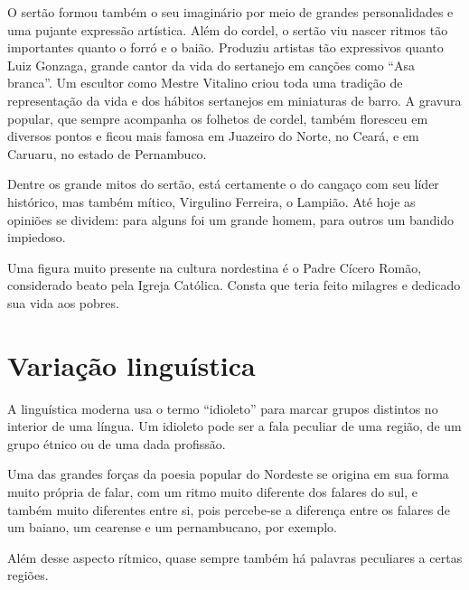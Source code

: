 O sertão formou também o seu imaginário por meio de grandes
personalidades e uma pujante expressão artística. Além do cordel, o
sertão viu nascer ritmos tão importantes quanto o forró e o baião.
Produziu artistas tão expressivos quanto Luiz Gonzaga, grande cantor da
vida do sertanejo em canções como ``Asa
branca''. Um escultor como Mestre Vitalino criou toda
uma tradição de representação da vida e dos hábitos sertanejos em
miniaturas de barro. A gravura popular, que sempre acompanha os
folhetos de cordel, também floresceu em diversos pontos e ficou mais
famosa em Juazeiro do Norte, no Ceará, e em Caruaru, no estado de
Pernambuco. 

Dentre os grande mitos do sertão, está certamente o do cangaço com seu
líder histórico, mas também mítico, Virgulino Ferreira, o Lampião. Até
hoje as opiniões se dividem: para alguns foi um grande homem, para
outros um bandido impiedoso. 

Uma figura muito presente na cultura nordestina é o Padre Cícero Romão,
considerado beato pela Igreja Católica. Consta que teria feito milagres
e dedicado sua vida aos pobres. 

\section{Variação linguística}

A linguística moderna usa o termo
``idioleto'' para marcar grupos
distintos no interior de uma língua. Um idioleto pode ser a fala
peculiar de uma região, de um grupo étnico ou de uma dada profissão. 

Uma das grandes forças da poesia popular do Nordeste se origina em sua
forma muito própria de falar, com um ritmo muito diferente dos falares
do sul, e também muito diferentes entre si, pois percebe-se a diferença
entre os falares de um baiano, um cearense e um pernambucano, por
exemplo.

Além desse aspecto rítmico, quase sempre também há palavras peculiares a
certas regiões. 

\pagebreak
